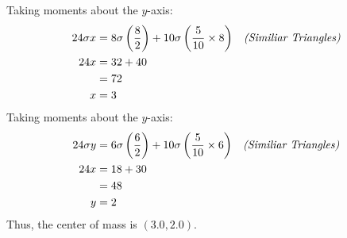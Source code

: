 \documentclass[answers]{exam}
\begin{document}
\begin{questions}
{\begin{solutionorbox}[60mm]
	Taking moments about the $y$-axis:
		\begin{align*}
			24\sigma x&=8\sigma\left(\frac{8}{2}\right) + 10\sigma\left(\frac{5}{10}\times 8\right) &&\text{\textit{(Similiar Triangles)}} \\
			24x&=32+40 \\
			&=72 \\
			x &= 3
		\end{align*}
	Taking moments about the $y$-axis:
		\begin{align*}
			24\sigma y&=6\sigma\left(\frac{6}{2}\right) + 10\sigma\left(\frac{5}{10}\times 6\right) &&\text{\textit{(Similiar Triangles)}} \\
			24x&=18+30 \\
			&=48 \\
			y &= 2
		\end{align*}
	Thus, the center of mass is $(3.0,2.0)$.
\end{solutionorbox}
}

\end{questions}

\ifprintanswers
	\pagebreak
\fi
\end{document}
